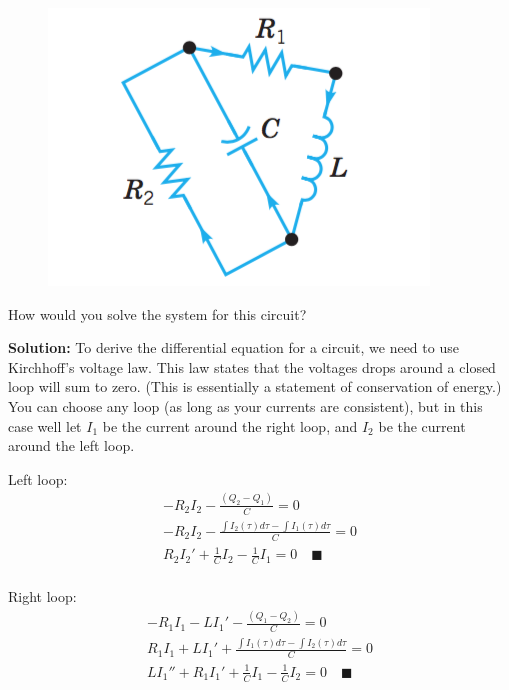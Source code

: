 \documentclass[letterpaper, fontsize=11pt]{scrartcl} %
\numberwithin{equation}{section} %
\numberwithin{figure}{section} %
\numberwithin{table}{section} %
\begin{document}
\begin{enumerate}
\begin{figure}[H]
\centering \includegraphics[width = 0.4\columnwidth]{finalReview2.png}
\end{figure}
How would you solve the system for this circuit? 
\par \textbf{Solution:} To derive the differential equation for a circuit, we need to use Kirchhoff's voltage law. This law states that the voltages drops around a closed loop will sum to zero. (This is essentially a statement of conservation of energy.) You can choose any loop (as long as your currents are consistent), but in this case well let $I_1$ be the current around the right loop, and $I_2$ be the current around the left loop. 
\par Left loop: 
\begin{gather*}
-R_2I_2 - \frac{(Q_2 - Q_1)}{C} = 0 \\
-R_2I_2 - \frac{\int I_2(\tau)d\tau - \int I_1(\tau)d\tau}{C} = 0\\
R_2I_2' + \frac{1}{C}I_2 - \frac{1}{C}I_1 = 0 \quad\blacksquare\\
\end{gather*}
\par Right loop: 
\begin{gather*}
-R_1I_1 - LI_1' - \frac{(Q_1 - Q_2)}{C} = 0\\
R_1I_1  + LI_1' + \frac{\int I_1(\tau)d\tau - \int I_2(\tau)d\tau}{C} = 0\\
LI_1'' +R_1I_1'  +  \frac{1}{C} I_1 - \frac{1}{C}I_2 = 0 \quad\blacksquare
\end{gather*}


\end{enumerate}
\end{document}
